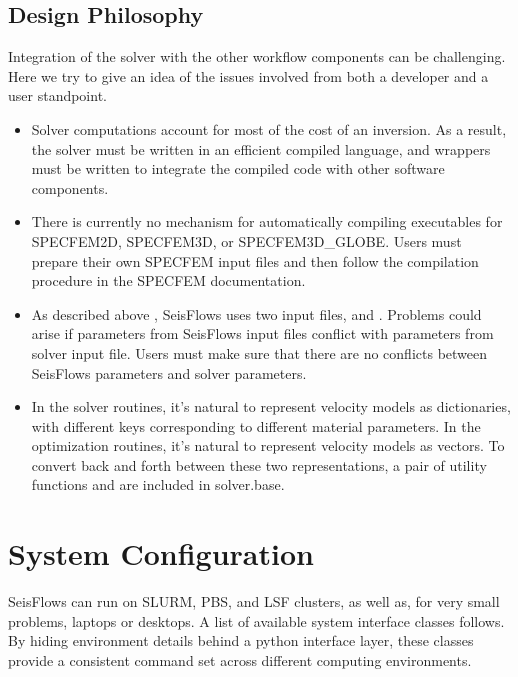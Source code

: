 \documentclass[letterpaper,10pt,english]{sphinxmanual}
\begin{document}
\subsection{Design Philosophy}
\label{\detokenize{main/usage:design-philosophy}}
Integration of the solver with the other workflow components can be challenging. Here we try to give an idea of the issues involved from both a developer and a user standpoint.
\begin{itemize}
\item {} 
Solver computations account for most of the cost of an inversion. As a result, the solver must be written in an efficient compiled language, and wrappers must be written to integrate the compiled code with other software components.

\item {} 
There is currently no mechanism for automatically compiling executables for SPECFEM2D, SPECFEM3D, or SPECFEM3D\_GLOBE. Users must prepare their own SPECFEM input files and then follow the compilation procedure in the SPECFEM documentation.

\item {} 
As described above {\hyperref[\detokenize{main/usage:submission}]{}}, SeisFlows uses two input files,  and .  Problems could arise if parameters from SeisFlows input files conflict with parameters from solver input file. Users must make sure that there are no conflicts between SeisFlows parameters and solver parameters.

\item {} 
In the solver routines, it’s natural to represent velocity models as dictionaries, with different keys corresponding to different material parameters.  In the optimization routines, it’s natural to represent velocity models as vectors. To convert back and forth between these two representations, a pair of utility functions\textendash{} and \textendash{}are included in solver.base.

\end{itemize}


\section{System Configuration}
\label{\detokenize{main/usage:system-configuration}}\label{\detokenize{main/usage:system}}
SeisFlows can run on SLURM, PBS, and LSF clusters, as well as, for very small problems, laptops or desktops.  A list of available system interface classes follows. By hiding environment details behind a python interface layer, these classes provide a consistent command set across different computing environments.
\end{document}
